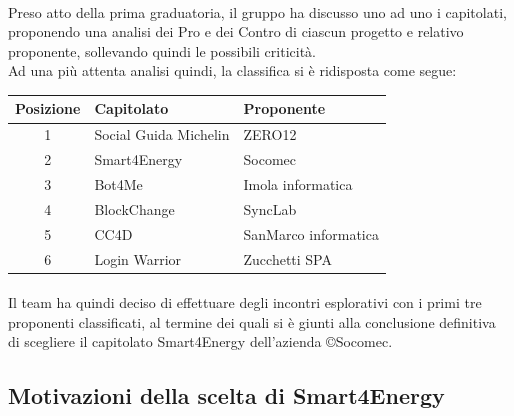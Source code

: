 \paragraph{}
Preso atto della prima graduatoria, il gruppo ha discusso uno ad uno i capitolati,
proponendo una analisi dei Pro e dei Contro di  ciascun progetto e relativo proponente,
sollevando quindi le possibili criticità.\\
Ad una più attenta analisi quindi, la classifica si è ridisposta come segue:\\
\begin{center}
    \begin{tabular}{|c|l|l|}
    \hline
        Posizione & Capitolato & Proponente\\
        \hline
        1 & Social Guida Michelin & ZERO12 \\
        2 & Smart4Energy & Socomec \\
        3 & Bot4Me & Imola informatica \\
        4 & BlockChange & SyncLab \\
        5 & CC4D & SanMarco informatica \\
        6 & Login Warrior & Zucchetti SPA \\
        \hline
    \end{tabular}
\end{center}
\paragraph{}
Il team ha quindi deciso di effettuare degli incontri esplorativi con i primi
tre proponenti classificati, al termine dei quali si è giunti alla conclusione
definitiva di scegliere il capitolato Smart4Energy dell'azienda
\copyright Socomec.\\
\newpage
\subsection{Motivazioni della scelta di Smart4Energy}
